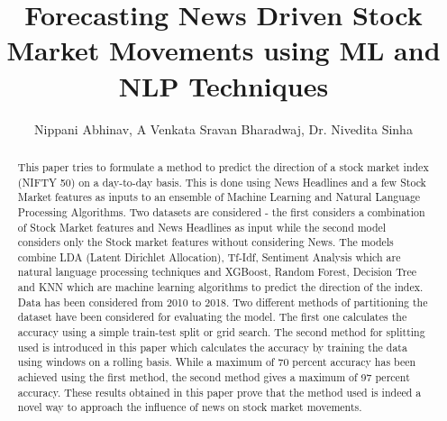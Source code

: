 \documentclass[preprint,12pt]{elsarticle}
\begin{document}
\begin{frontmatter}

\title{Forecasting News Driven Stock Market Movements using ML and NLP Techniques}


\author{Nippani Abhinav, A Venkata Sravan Bharadwaj, Dr. Nivedita Sinha }

\address{Birla Institute of Technology and Sciences - Pilani, Hyderabad Campus, India}
\address[Nippani Abhinav]{f20160278@hyderabad.bits-pilani.ac.in}
\address[A Venkata Sravan Bharadwaj]{f20160400@hyderabad.bits-pilani.ac.in}
\address[Dr. Nivedita Sinha]{nivedita.sinha@hyderabad.bits-pilani.ac.in}

\begin{abstract}
This paper tries to formulate a method to predict the direction of a stock market index (NIFTY 50) on a day-to-day basis. This is done using News Headlines and a few Stock Market features as inputs to an ensemble of Machine Learning and Natural Language Processing Algorithms. 
Two datasets are considered - the first considers a combination of Stock Market features and News Headlines as input while the second model considers only the Stock market features without considering News.
The models combine LDA (Latent Dirichlet Allocation), Tf-Idf, Sentiment Analysis which are natural language processing techniques and XGBoost, Random Forest, Decision Tree and KNN which are machine learning algorithms to predict the direction of the index. Data has been considered from 2010 to 2018. 
Two different methods of partitioning the dataset have been considered for evaluating the model. The first one calculates the accuracy using a simple train-test split or grid search. The second method for splitting used is introduced in this paper which calculates the accuracy by training the data using windows on a rolling basis. While a maximum of 70 percent accuracy has been achieved using the first method, the second method gives a maximum of 97 percent accuracy.
These results obtained in this paper prove that the method used is indeed a novel way to approach the influence of news on stock market movements.


\end{abstract}
\end{frontmatter}
\end{document}

